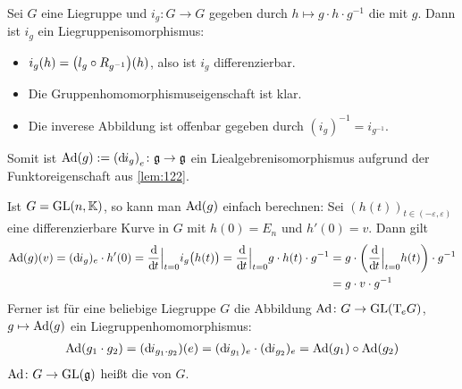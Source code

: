 \begin{beispiel*}[{name=[Konjugation und adjungierte Darstellung]}]
	Sei $G$ eine Liegruppe und $i_g \colon G \to G$ gegeben durch $h \mapsto g \cdot h \cdot g^{-1}$ die  mit $g$.
	Dann ist $i_g$ ein Liegruppenisomorphismus:
	\begin{itemize}[itemsep=0pt]
		\item $i_g(h) = \enbrace*{l_g \circ R_{g^{-1}}}(h)$, also ist $i_g$ differenzierbar.
		\item Die Gruppenhomomorphismuseigenschaft ist klar. 
		\item Die inverese Abbildung ist offenbar gegeben durch $(i_g)^{-1}= i_{g^{-1}}$.
	\end{itemize}
	Somit ist $\Ad(g) := \enbrace*{\mathd i_g}_e \colon \mathfrak{g} \to \mathfrak{g}$ ein Liealgebrenisomorphismus aufgrund der Funktoreigenschaft aus \autoref{lem:122}.
	
	Ist $G = \GL(n,\mathbb{K})$, so kann man $\Ad(g)$ einfach berechnen:
	Sei $(h(t))_{t \in (-\varepsilon,\varepsilon)}$ eine differenzierbare Kurve in $G$ mit $h(0)= E_n$ und $h'(0)=v$.
	Dann gilt
	\begin{align}
		\Ad(g)(v)= (\mathd i_g)_e \cdot h'(0) = \diffd{}{t}\Big|_{t=0} i_g \enbrace[\big]{h(t)} = \diffd{}{t}\Big|_{t=0} g \cdot h(t) \cdot g^{-1}
		&= g \cdot \enbrace*{\diffd{}{t}\Big|_{t=0} h(t)} \cdot g^{-1}\\
		&= g \cdot v \cdot g^{-1}
	\end{align}
	Ferner ist für eine beliebige Liegruppe $G$ die Abbildung $\Ad \colon G \to \GL\enbrace*{\Tmap_e G}$, $g \mapsto \Ad(g)$ ein Liegruppenhomomorphismus:
	\begin{align}
		\Ad(g_1 \cdot g_2) = (\mathd i_{g_1 \cdot g_2})(e) = (\mathd i_{g_1})_e \cdot (\mathd i_{g_2})_e = \Ad(g_1) \circ \Ad(g_2)
	\end{align}
	$\Ad \colon G \to \GL(\mathfrak{g})$ heißt die  von $G$.
\end{beispiel*}


